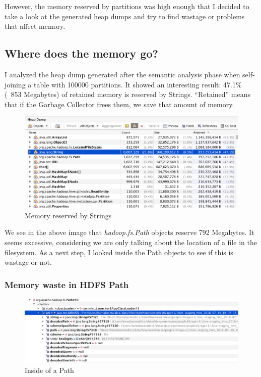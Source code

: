 However, the memory reserved by partitions was high enough that I decided to take a look at the generated heap dumps and try to find wastage or problems that affect memory.

\subsection{Where does the memory go?}
I analyzed the heap dump generated after the semantic analysis phase when self-joining a table with 100000 partitions. It showed an interesting result: 47.1\% (~853 Megabytes) of retained memory is reserved by Strings. “Retained” means that if the Garbage Collector frees them, we save that amount of memory. 

\begin{figure}[H]
	\includegraphics[width=150mm, keepaspectratio]{figures/string_memory.png}
	\centering
	\caption{Memory reserved by Strings}
\end{figure}

We see in the above image that \textit{hadoop.fs.Path} objects reserve 792 Megabytes. It seems excessive, considering we are only talking about the location of a file in the filesystem. As a next step, I looked inside the Path objects to see if this is wastage or not.

\subsubsection{Memory waste in HDFS Path}
\begin{figure}[H]
	\includegraphics[width=150mm, keepaspectratio]{figures/path_memory.png}
	\centering
	\caption{Inside of a Path}
\end{figure}

